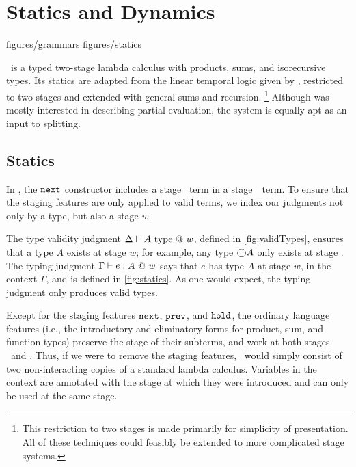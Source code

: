 
\section{\texorpdfstring{\lang}{λ12} Statics and Dynamics}
\label{sec:semantics}

 {figures/grammars}
 {figures/statics}

\lang\ is a typed two-stage lambda calculus with products, sums, and isorecursive types.
Its statics are adapted from the linear temporal logic given by \cite{davies96},
restricted to two stages and extended with general sums and recursion.%
\footnote{This restriction to two stages is made primarily for simplicity of
presentation. All of these techniques could feasibly be extended to more
complicated stage systems.} 
Although \cite{davies96} was mostly interested in describing partial evaluation,
the system is equally apt as an input to splitting.

\subsection{Statics}

In \lang, the ${\tt next}$ constructor includes a stage \bbtwo\ term in a
stage~\bbone\ term. To ensure that the staging features are only applied to
valid terms, we index our judgments not only by a type, but also a stage $w$.

The type validity judgment $\Delta \vdash A ~{\rm type}~@~w$, defined in
\cref{fig:validTypes}, ensures that a type $A$ exists at stage $w$; for
example, any type $\bigcirc A$ only exists at stage \bbone.  The typing judgment
$\Gamma{} \vdash {e}:{A}~@~w$ says that $e$ has type $A$ at stage $w$, in the context
$\Gamma$, and is defined in \cref{fig:statics}.  As one would expect, the
typing judgment only produces valid types.

Except for the staging features ${\tt next}$, ${\tt prev}$, and ${\tt hold}$, the ordinary
language features (i.e., the introductory and eliminatory forms for product,
sum, and function types) preserve the stage of their subterms, and work at both
stages \bbone\ and \bbtwo. Thus, if we were to remove the staging features,
\lang\ would simply consist of two non-interacting copies of a standard lambda
calculus. Variables in the context are annotated with the stage at which they
were introduced and can only be used at the same stage.

